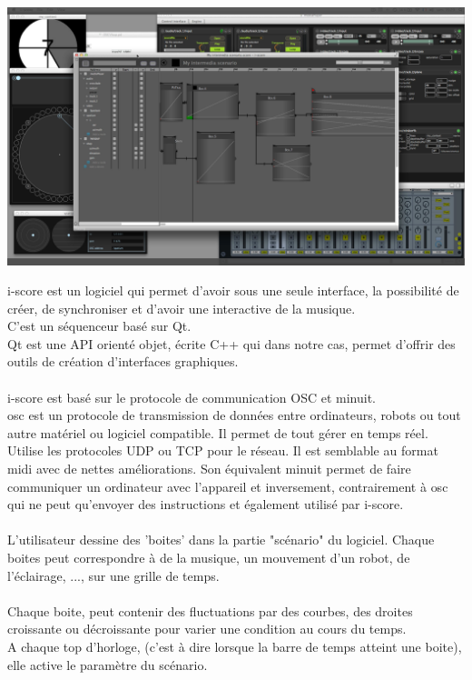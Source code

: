\documentclass[10pt,a4paper]{report}
\begin{document}
\begin{center}
\includegraphics[scale=0.1]{image/iscore.jpg}
\end{center}

i-score est un logiciel qui permet d'avoir sous une seule interface, la possibilité de créer, de synchroniser et d'avoir une interactive de la musique.
\\
C'est un séquenceur basé sur Qt.\\
Qt est une API orienté objet, écrite C++ qui dans notre cas, permet d'offrir des outils de création d'interfaces graphiques.
\paragraph{}
i-score est basé sur le protocole de communication OSC et minuit.
\\
\acrfull{osc} est un protocole de transmission de données entre ordinateurs, robots ou tout autre matériel ou logiciel compatible. Il permet de tout gérer en temps réel. Utilise les protocoles UDP ou TCP pour le réseau. Il est semblable au format \acrfull{midi} avec de nettes améliorations. Son équivalent minuit permet de faire communiquer un ordinateur avec l'appareil et inversement, contrairement à \acrshort{osc} qui ne peut qu'envoyer des instructions et également utilisé par i-score.
\paragraph{}
L'utilisateur dessine des 'boites' dans la partie "scénario" du logiciel. Chaque boites peut correspondre à de la musique, un mouvement d'un robot, de l'éclairage, ..., sur une grille de temps.
\paragraph{}
Chaque boite, peut contenir des fluctuations par des courbes, des droites croissante ou décroissante pour varier une condition au cours du temps.
\\
A chaque top d'horloge, (c'est à dire lorsque la barre de temps atteint une boite), elle active le paramètre du scénario.
\end{document}
